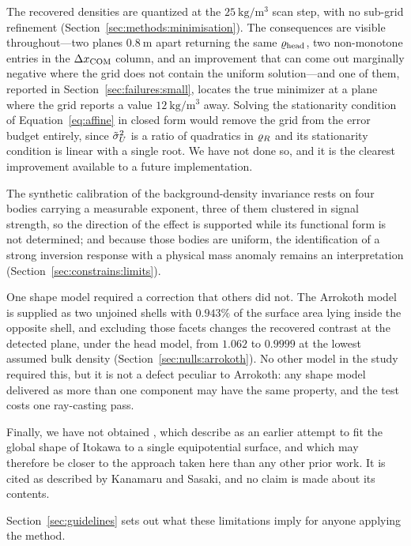 The recovered densities are quantized at the $\SI{25}{\kilo\gram\per
\cubic\metre}$ scan step, with no sub-grid refinement
(Section~\ref{sec:methods:minimisation}). The consequences are visible
throughout---two planes $\SI{0.8}{\metre}$ apart returning the same
$\varrho_{\mathrm{head}}$, two non-monotone entries in the $\Delta x_{\mathrm{COM}}$ column, and an
improvement that can come out marginally negative where the grid does not
contain the uniform solution---and one of them, reported in
Section~\ref{sec:failures:small}, locates the true minimizer at a plane where
the grid reports a value $\SI{12}{\kilo\gram\per\cubic\metre}$ away. Solving
the stationarity condition of Equation~\eqref{eq:affine} in closed form would
remove the grid from the error budget entirely, since $\tilde{\sigma}_{U}^{2}$ is a
ratio of quadratics in $\varrho_{R}$ and its stationarity condition is linear with
a single root. We have not done so, and it is the clearest improvement
available to a future implementation.

The synthetic calibration of the background-density invariance rests on four
bodies carrying a measurable exponent, three of them clustered in signal
strength, so the direction of the effect is supported while its functional
form is not determined; and because those bodies are uniform, the
identification of a strong inversion response with a physical mass anomaly
remains an interpretation (Section~\ref{sec:constrains:limits}).

One shape model required a correction that others did not. The Arrokoth
model is supplied as two unjoined shells with $0.943\%$ of the surface area
lying inside the opposite shell, and excluding those facets changes the
recovered contrast at the detected plane, under the head model, from
$1.062$ to $0.9999$ at the lowest assumed bulk density
(Section~\ref{sec:nulls:arrokoth}). No other model in the study required
this, but it is not a defect peculiar to Arrokoth: any shape model delivered
as more than one component may have the same property, and the test costs one
ray-casting pass.

Finally, we have not obtained \citet{motooka2012}, which
\citet{kanamaru2019} describe as an earlier attempt to fit the global shape
of Itokawa to a single equipotential surface, and which may therefore be
closer to the approach taken here than any other prior work. It is cited as
described by Kanamaru and Sasaki, and no claim is made about its contents.

Section~\ref{sec:guidelines} sets out what these limitations imply for
anyone applying the method.
